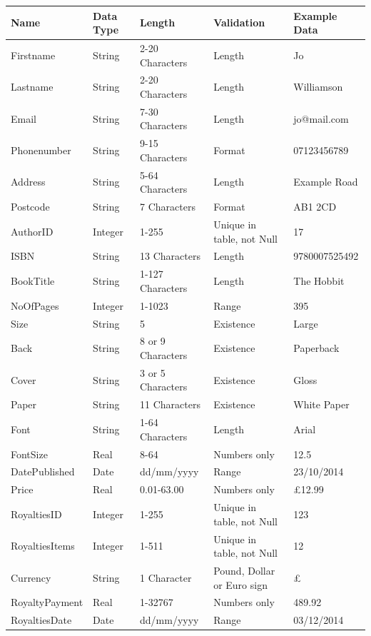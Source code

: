 \begin{center}
\begin{tabular}{|p{2.5cm}|p{1cm}|p{2cm}|p{2cm}|p{2cm}|}
    \hline
    \textbf{Name} & \textbf{Data Type} & \textbf{Length} & \textbf{Validation} & \textbf{Example Data} \\ \hline
    Firstname & String & 2-20 Characters & Length & Jo  \\ \hline
    Lastname & String & 2-20 Characters & Length & Williamson  \\ \hline
    Email & String & 7-30 Characters & Length & jo@mail.com  \\ \hline
    Phonenumber & String & 9-15 Characters & Format & 07123456789  \\ \hline
    Address & String & 5-64 Characters & Length & Example Road  \\ \hline
    Postcode & String & 7 Characters & Format & AB1 2CD  \\ \hline
    AuthorID & Integer & 1-255 & Unique in table, not Null & 17  \\ \hline
    ISBN & String & 13 Characters & Length & 9780007525492 \\ \hline
    BookTitle & String & 1-127 Characters & Length & The Hobbit  \\ \hline
    NoOfPages & Integer & 1-1023 & Range & 395  \\ \hline
    Size & String & 5 & Existence & Large \\ \hline
    Back & String & 8 or 9 Characters& Existence & Paperback  \\ \hline
    Cover & String & 3 or 5 Characters & Existence & Gloss \\ \hline
    Paper & String & 11 Characters & Existence & White Paper\\ \hline
    Font & String & 1-64 Characters & Length & Arial  \\ \hline
    FontSize & Real & 8-64 & Numbers only & 12.5  \\ \hline
    DatePublished & Date & dd/mm/yyyy & Range & 23/10/2014 \\ \hline
    Price & Real & 0.01-63.00 & Numbers only & £12.99 \\ \hline
    RoyaltiesID & Integer & 1-255 & Unique in table, not Null & 123 \\ \hline
    RoyaltiesItems & Integer & 1-511 & Unique in table, not Null & 12 \\ \hline
    Currency & String & 1 Character & Pound, Dollar or Euro sign & £ \\ \hline
    RoyaltyPayment & Real & 1-32767 & Numbers only & 489.92 \\ \hline
    RoyaltiesDate & Date & dd/mm/yyyy & Range & 03/12/2014 \\ \hline

\end{tabular}
\end{center}

